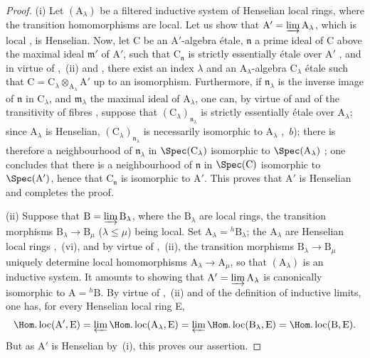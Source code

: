 \begin{proof}
(i) Let $(\mathrm{A}_\lambda)$ be a filtered inductive system of Henselian local rings, where the transition homomorphisms are local.
Let us show that $\mathrm{A}'=\varinjlim\mathrm{A}_\lambda$, which is local , is Henselian.
Now, let C be an $\mathrm{A}'$-algebra \'{e}tale, $\mathfrak{n}$ a prime ideal
of C above the maximal ideal $\mathfrak{m}'$ of $\mathrm{A}'$, such that $\mathrm{C}_{\mathfrak{n}}$ is strictly essentially \'{e}tale over $\mathrm{A}'$ , and in virtue of ,~(ii) and , there exist an index $\lambda$ and an $\mathrm{A}_\lambda$-algebra $\mathrm{C}_\lambda$ \'{e}tale such that $\mathrm{C}=\mathrm{C}_\lambda\otimes_{\mathrm{A}_\lambda}\mathrm{A}'$ up to an isomorphism.
Furthermore, if $\mathfrak{n}_\lambda$ is the inverse image of $\mathfrak{n}$ in $\mathrm{C}_\lambda$, and $\mathfrak{m}_\lambda$ the maximal ideal of $\mathrm{A}_\lambda$, one can, by virtue of  and of the transitivity of fibres , suppose that $(\mathrm{C}_\lambda)_{\mathfrak{n}_\lambda}$ is strictly essentially \'{e}tale over $\mathrm{A}_\lambda$;
since $\mathrm{A}_\lambda$ is Henselian, $(\mathrm{C}_\lambda)_{\mathfrak{n}_\lambda}$ is necessarily isomorphic to $\mathrm{A}_\lambda$ ,~$b$);
there is therefore a neighbourhood of $\mathfrak{n}_\lambda$ in $\Spec(\mathrm{C}_\lambda)$ isomorphic to $\Spec(\mathrm{A}_\lambda)$ ;
one concludes that there is a neighbourhood of $\mathfrak{n}$ in $\Spec(\mathrm{C})$ isomorphic to $\Spec(\mathrm{A}')$, hence that $\mathrm{C}_\mathfrak{n}$ is isomorphic to $\mathrm{A}'$.  This proves that $\mathrm{A}'$ is Henselian  and completes the proof.

(ii) Suppose that $\mathrm{B}=\varinjlim\mathrm{B}_\lambda$, where the $\mathrm{B}_\lambda$ are local rings, the transition morphisms $\mathrm{B}_\lambda\to\mathrm{B}_\mu$ ($\lambda\leq\mu$) being local.
Set $\mathrm{A}_\lambda={}^h\!\mathrm{B}_\lambda$;
the $\mathrm{A}_\lambda$ are Henselian local rings ,~(vi), and by virtue of ,~(ii), the transition morphisms $\mathrm{B}_\lambda\to\mathrm{B}_\mu$ uniquely determine local homomorphisms $\mathrm{A}_\lambda\to\mathrm{A}_\mu$, so that $(\mathrm{A}_\lambda)$ is an inductive system.
It amounts to showing that $\mathrm{A}'=\varinjlim\mathrm{A}_\lambda$ is canonically isomorphic to $\mathrm{A}={}^h\!\mathrm{B}$.
By virtue of ,~(ii) and of the definition of inductive limits, one has, for every Henselian local ring E,
\[
  \Hom.\operatorname{loc}(\mathrm{A}',\mathrm{E})=\varprojlim\Hom.\operatorname{loc}(\mathrm{A}_\lambda,\mathrm{E})=\varprojlim\Hom.\operatorname{loc}(\mathrm{B}_\lambda,\mathrm{E})=\Hom.\operatorname{loc}(\mathrm{B},\mathrm{E}).
\]
But as $\mathrm{A}'$ is Henselian by~(i), this proves our assertion.


\end{proof}
